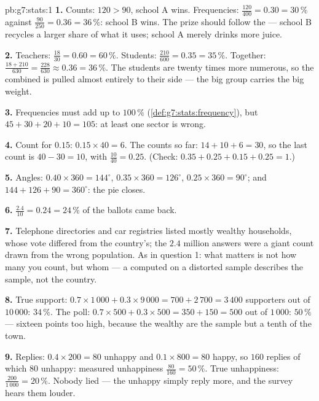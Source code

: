 \begin{solution}{pb:g7:stats:1}
\textbf{1.} Counts: $120 > 90$, school A wins. Frequencies:
$\frac{120}{400} = 0.30 = 30\,\%$ against
$\frac{90}{250} = 0.36 = 36\,\%$: school B wins. The prize
should follow the  --- school B recycles a larger share
of what it uses; school A merely drinks more juice.

\textbf{2.} Teachers: $\frac{18}{30} = 0.60 = 60\,\%$. Students:
$\frac{210}{600} = 0.35 = 35\,\%$. Together:
$\frac{18 + 210}{630} = \frac{228}{630} \approx 0.36 =
36\,\%$. The students are twenty times more numerous, so the
combined  is pulled almost entirely to their side ---
the big group carries the big weight.

\textbf{3.} Frequencies must add up to $100\,\%$
(\cref{def:g7:stats:frequency}), but
$45 + 30 + 20 + 10 = 105$: at least one sector is wrong.

\textbf{4.} Count for  $0.15$:
$0.15 \times 40 = 6$. The counts so far: $14 + 10 + 6 = 30$, so
the last count is $40 - 30 = 10$, with 
$\frac{10}{40} = 0.25$. (Check: $0.35 + 0.25 + 0.15 + 0.25 =
1$.)

\textbf{5.} Angles: $0.40 \times 360 = 144^\circ$,
$0.35 \times 360 = 126^\circ$, $0.25 \times 360 = 90^\circ$;
and $144 + 126 + 90 = 360^\circ$: the pie closes.

\textbf{6.} $\frac{2.4}{10} = 0.24 = 24\,\%$ of the ballots came
back.

\textbf{7.} Telephone directories and car registries listed
mostly wealthy households, whose vote differed from the
country's; the $2.4$ million answers were a giant count drawn
from the wrong population. As in question 1: what matters is
not how many you count, but whom --- a  computed on a
distorted sample describes the sample, not the country.

\textbf{8.} True support:
$0.7 \times 1\,000 + 0.3 \times 9\,000 = 700 + 2\,700 = 3\,400$
supporters out of $10\,000$: $34\,\%$. The poll:
$0.7 \times 500 + 0.3 \times 500 = 350 + 150 = 500$ out of
$1\,000$: $50\,\%$ --- sixteen points too high, because the
wealthy are  the sample but a tenth of the town.

\textbf{9.} Replies: $0.4 \times 200 = 80$ unhappy and
$0.1 \times 800 = 80$ happy, so $160$ replies of which $80$
unhappy: measured unhappiness $\frac{80}{160} = 50\,\%$. True
unhappiness: $\frac{200}{1\,000} = 20\,\%$. Nobody lied ---
the unhappy simply reply more, and the survey hears them
louder.


\end{solution}
